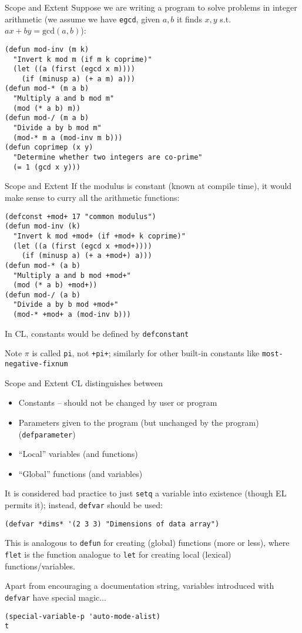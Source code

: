 \documentclass[presentation]{beamer}
\begin{document}
\begin{frame}[fragile]{Scope and Extent}
  Suppose we are writing a program to solve problems in integer arithmetic (we assume we have \texttt{egcd}, given $a,b$ it finds $x,y$ s.t.\ $ax+by=\mathrm{gcd}(a,b)$):
\begin{verbatim}
(defun mod-inv (m k)
  "Invert k mod m (if m k coprime)"
  (let ((a (first (egcd x m))))
    (if (minusp a) (+ a m) a)))
(defun mod-* (m a b)
  "Multiply a and b mod m"
  (mod (* a b) m))
(defun mod-/ (m a b)
  "Divide a by b mod m"
  (mod-* m a (mod-inv m b)))
(defun coprimep (x y)
  "Determine whether two integers are co-prime"
  (= 1 (gcd x y)))
\end{verbatim}
\end{frame}

\begin{frame}[fragile]{Scope and Extent}
If the modulus is constant (known at compile time), it would make
sense to curry all the arithmetic functions:
\begin{verbatim}
(defconst +mod+ 17 "common modulus")
(defun mod-inv (k)
  "Invert k mod +mod+ (if +mod+ k coprime)"
  (let ((a (first (egcd x +mod+))))
    (if (minusp a) (+ a +mod+) a)))
(defun mod-* (a b)
  "Multiply a and b mod +mod+"
  (mod (* a b) +mod+))
(defun mod-/ (a b)
  "Divide a by b mod +mod+"
  (mod-* +mod+ a (mod-inv b)))
\end{verbatim}
In CL, constants would be defined by \texttt{defconstant}

Note $\pi$ is called \texttt{pi}, not \texttt{+pi+}; similarly for other built-in constants like \texttt{most-negative-fixnum}
\end{frame}

\begin{frame}[fragile]{Scope and Extent}
  CL distinguishes between
  \begin{itemize}
  \item Constants -- should not be changed by user or program
  \item Parameters given to the program (but unchanged by the program) (\texttt{defparameter})
  \item ``Local'' variables (and functions)
  \item ``Global'' functions (and variables)
  \end{itemize}
  It is considered bad practice to just \texttt{setq} a variable into existence (though EL permits it); instead, \texttt{defvar} should be used:
\begin{verbatim}
(defvar *dims* '(2 3 3) "Dimensions of data array")
\end{verbatim}
This is analogous to \texttt{defun} for creating (global) functions (more or less), where \texttt{flet} is the function analogue to \texttt{let} for creating local (lexical) functions/variables.

Apart from encouraging a documentation string, variables introduced with \texttt{defvar} have special magic...
\begin{verbatim}
(special-variable-p 'auto-mode-alist)
t
\end{verbatim}

\end{frame}
\end{document}
